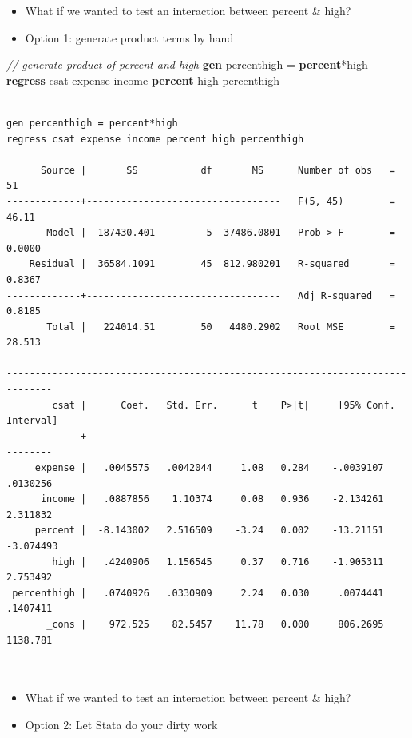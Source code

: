 \documentclass[]{book}
\newenvironment{Shaded}{\begin{snugshade}}{\end{snugshade}}
\newcommand{\CommentTok}[1]{\textcolor[rgb]{0.56,0.35,0.01}{\textit{#1}}}
\newcommand{\KeywordTok}[1]{\textcolor[rgb]{0.13,0.29,0.53}{\textbf{#1}}}
\newcommand{\NormalTok}[1]{#1}
\providecommand{\tightlist}{%
  \setlength{\itemsep}{0pt}\setlength{\parskip}{0pt}}
\begin{document}
\begin{itemize}
\tightlist
\item
  What if we wanted to test an interaction between percent \& high?
\item
  Option 1: generate product terms by hand
\end{itemize}

\begin{Shaded}
\begin{Highlighting}[]
  \CommentTok{// generate product of percent and high}
  \KeywordTok{gen}\NormalTok{ percenthigh = }\KeywordTok{percent}\NormalTok{*high }
  \KeywordTok{regress}\NormalTok{ csat expense income }\KeywordTok{percent}\NormalTok{ high percenthigh}
\end{Highlighting}
\end{Shaded}

\begin{verbatim}

gen percenthigh = percent*high
regress csat expense income percent high percenthigh

      Source |       SS           df       MS      Number of obs   =        51
-------------+----------------------------------   F(5, 45)        =     46.11
       Model |  187430.401         5  37486.0801   Prob > F        =    0.0000
    Residual |  36584.1091        45  812.980201   R-squared       =    0.8367
-------------+----------------------------------   Adj R-squared   =    0.8185
       Total |   224014.51        50   4480.2902   Root MSE        =    28.513

------------------------------------------------------------------------------
        csat |      Coef.   Std. Err.      t    P>|t|     [95% Conf. Interval]
-------------+----------------------------------------------------------------
     expense |   .0045575   .0042044     1.08   0.284    -.0039107    .0130256
      income |   .0887856    1.10374     0.08   0.936    -2.134261    2.311832
     percent |  -8.143002   2.516509    -3.24   0.002    -13.21151   -3.074493
        high |   .4240906   1.156545     0.37   0.716    -1.905311    2.753492
 percenthigh |   .0740926   .0330909     2.24   0.030     .0074441    .1407411
       _cons |    972.525    82.5457    11.78   0.000     806.2695    1138.781
------------------------------------------------------------------------------
\end{verbatim}

\begin{itemize}
\tightlist
\item
  What if we wanted to test an interaction between percent \& high?
\item
  Option 2: Let Stata do your dirty work
\end{itemize}
\end{document}
